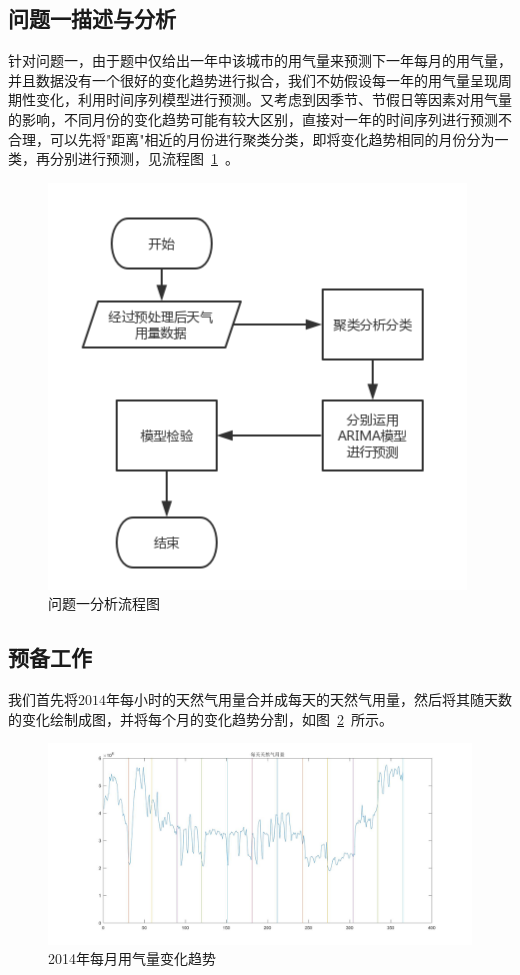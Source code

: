 \documentclass{whutmod}
\begin{document}
	\subsection{问题一描述与分析}
	针对问题一，由于题中仅给出一年中该城市的用气量来预测下一年每月的用气量，并且数据没有一个很好的变化趋势进行拟合，我们不妨假设每一年的用气量呈现周期性变化，利用时间序列模型进行预测。又考虑到因季节、节假日等因素对用气量的影响，不同月份的变化趋势可能有较大区别，直接对一年的时间序列进行预测不合理，可以先将"距离"相近的月份进行聚类分类，即将变化趋势相同的月份分为一类，再分别进行预测，见流程图~\ref{aaa}~。
	\begin{figure}[H]
		\centering
		\includegraphics[width=.6\textwidth]{figures/aaa.png}
		\caption{问题一分析流程图}\label{aaa}
	\end{figure}
	\subsection{预备工作}
	我们首先将$2014$年每小时的天然气用量合并成每天的天然气用量，然后将其随天数的变化绘制成图，并将每个月的变化趋势分割，如图~\ref{img001}~所示。
	
	\begin{figure}[H]
		\centering
		\includegraphics[width=\textwidth]{figures/1.jpg}
		\caption{2014年每月用气量变化趋势}\label{img001}
	\end{figure}
	
\end{document}
